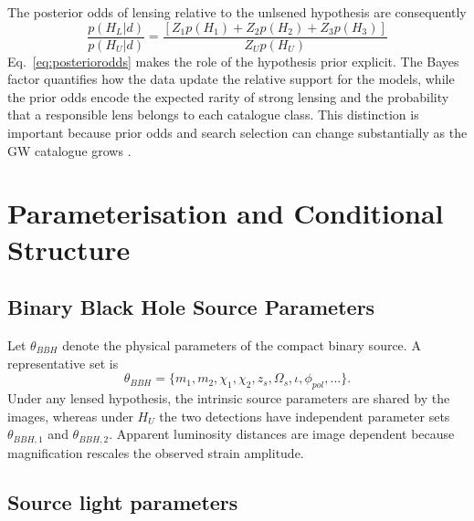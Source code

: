 \documentclass[pdflatex,sn-mathphys-num]{sn-jnl}%
\theoremstyle{thmstyleone}%
\theoremstyle{thmstyletwo}%
\theoremstyle{thmstylethree}%
\begin{document}
The posterior odds of lensing relative to the unlsened hypothesis are consequently
\begin{equation}
\label{eq:posteriorodds}
\frac{p(H_L|d)}{p(H_U|d)} = \frac{[Z_1p(H_1) + Z_2p(H_2) + Z_3p(H_3)]}{Z_Up(H_U)}
\end{equation}
Eq.~\eqref{eq:posteriorodds} makes the role of the hypothesis prior explicit. 
The Bayes factor quantifies how the data update the relative support for the models, while the prior odds encode the expected rarity of strong lensing and the probability that a responsible lens belongs to each catalogue class. 
This distinction is important because prior odds and search selection can change substantially as the GW catalogue grows \cite{7}\cite{9}\cite{14}.

\section{Parameterisation and Conditional Structure}

\subsection{Binary Black Hole Source Parameters}

Let $\theta_{BBH}$ denote the physical parameters of the compact binary source.
A representative set is
\begin{equation}
\theta_{BBH}=\{m_1,m_2,\chi_1,\chi_2,z_s,\Omega_s,\iota,\phi_{pol},...\}.
\end{equation}
Under any lensed hypothesis, the intrinsic source parameters are shared by the images, whereas under $H_U$ the two detections have independent parameter sets $\theta_{BBH,1}$ and $\theta_{BBH,2}$.
Apparent luminosity distances are image dependent because magnification rescales the observed strain amplitude.

\subsection{Source light parameters}
\end{document}
